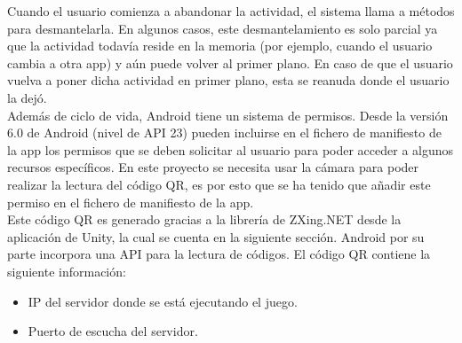Cuando el usuario comienza a abandonar la actividad, el sistema llama a m\'etodos para desmantelarla. En algunos casos, este desmantelamiento es solo parcial ya que la actividad todav\'ia reside en la memoria (por ejemplo, cuando el usuario cambia a otra app) y a\'un puede volver al primer plano. En caso de que el usuario vuelva a poner dicha actividad en primer plano, esta se reanuda donde el usuario la dej\'o.
\\
Adem\'as de ciclo de vida, Android tiene un sistema de permisos. Desde la versi\'on 6.0 de Android (nivel de API 23) pueden incluirse en el fichero de manifiesto de la app los permisos que se deben solicitar al usuario para poder acceder a algunos recursos espec\'ificos. En este proyecto se necesita usar la c\'amara para poder realizar la lectura del c\'odigo QR, es por esto que se ha tenido que a\~nadir este permiso en el fichero de manifiesto de la app.
\\
Este c\'odigo QR es generado gracias a la librer\'ia de ZXing.NET desde la aplicaci\'on de Unity, la cual se cuenta en la siguiente secci\'on. Android por su parte incorpora una API para la lectura de c\'odigos. El c\'odigo QR contiene la siguiente informaci\'on:

\begin{itemize}
\item IP del servidor donde se est\'a ejecutando el juego.
\item Puerto de escucha del servidor.
\end {itemize}

